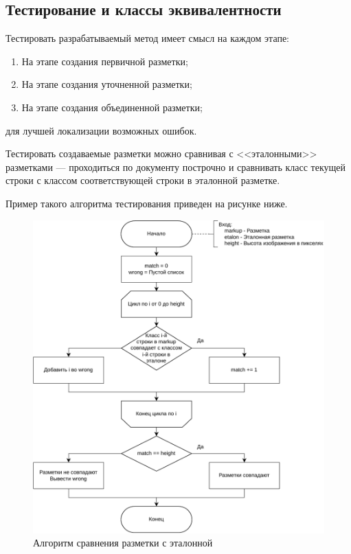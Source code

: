 

\subsection{Тестирование и классы эквивалентности}

Тестировать разрабатываемый метод имеет смысл на каждом этапе:
\begin{enumerate}
    \item На этапе создания первичной разметки;
    \item На этапе создания уточненной разметки;
    \item На этапе создания объединенной разметки;
\end{enumerate}
для лучшей локализации возможных ошибок.

Тестировать создаваемые разметки можно сравнивая с <<эталонными>> разметками --- проходиться по документу построчно и сравнивать класс текущей строки с классом соответствующей строки в эталонной разметке.

Пример такого алгоритма тестирования приведен на рисунке ниже.

\begin{figure}[H]
	\centering
    \includegraphics[width=\textwidth]{diag/vkr-test-primary-v2.pdf}
	\caption{Алгоритм сравнения разметки с эталонной}
	\label{fig:test}
\end{figure}

